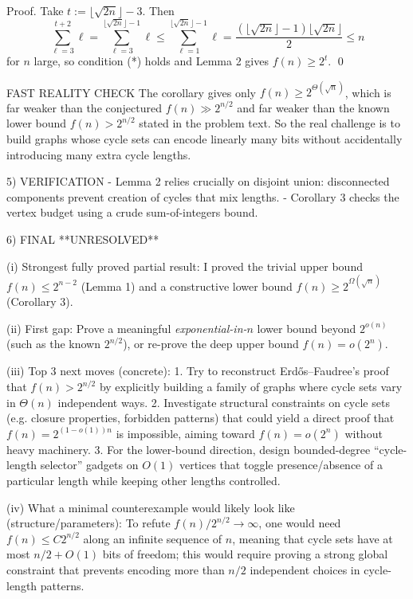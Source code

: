 Proof.
Take $t:=\lfloor \sqrt{2n}\rfloor-3$.
Then
\[\sum_{\ell=3}^{t+2}\ell = \sum_{\ell=3}^{\lfloor \sqrt{2n}\rfloor-1}\ell \le \sum_{\ell=1}^{\lfloor \sqrt{2n}\rfloor-1}\ell
 = \frac{(\lfloor \sqrt{2n}\rfloor-1)\lfloor \sqrt{2n}\rfloor}{2}\le n\]
for $n$ large, so condition (*) holds and Lemma 2 gives $f(n)\ge 2^t$. \qed

FAST REALITY CHECK
The corollary gives only $f(n)\ge 2^{\Theta(\sqrt n)}$, which is far weaker than the conjectured $f(n)\gg 2^{n/2}$ and far weaker than the known lower bound $f(n)>2^{n/2}$ stated in the problem text.
So the real challenge is to build graphs whose cycle sets can encode linearly many bits without accidentally introducing many extra cycle lengths.

5) VERIFICATION
- Lemma 2 relies crucially on disjoint union: disconnected components prevent creation of cycles that mix lengths.
- Corollary 3 checks the vertex budget using a crude sum-of-integers bound.

6) FINAL
**UNRESOLVED**

(i) Strongest fully proved partial result:
I proved the trivial upper bound $f(n)\le 2^{n-2}$ (Lemma 1) and a constructive lower bound $f(n)\ge 2^{\Omega(\sqrt n)}$ (Corollary 3).

(ii) First gap:
Prove a meaningful \emph{exponential-in-$n$} lower bound beyond $2^{o(n)}$ (such as the known $2^{n/2}$), or re-prove the deep upper bound $f(n)=o(2^n)$.

(iii) Top 3 next moves (concrete):
1. Try to reconstruct Erd\H{o}s--Faudree's proof that $f(n)>2^{n/2}$ by explicitly building a family of graphs where cycle sets vary in $\Theta(n)$ independent ways.
2. Investigate structural constraints on cycle sets (e.g. closure properties, forbidden patterns) that could yield a direct proof that $f(n)=2^{(1-o(1))n}$ is impossible, aiming toward $f(n)=o(2^n)$ without heavy machinery.
3. For the lower-bound direction, design bounded-degree ``cycle-length selector'' gadgets on $O(1)$ vertices that toggle presence/absence of a particular length while keeping other lengths controlled.

(iv) What a minimal counterexample would likely look like (structure/parameters):
To refute $f(n)/2^{n/2}\to\infty$, one would need $f(n)\le C 2^{n/2}$ along an infinite sequence of $n$,
meaning that cycle sets have at most $n/2+O(1)$ bits of freedom; this would require proving a strong global constraint that prevents encoding more than $n/2$ independent choices in cycle-length patterns.


